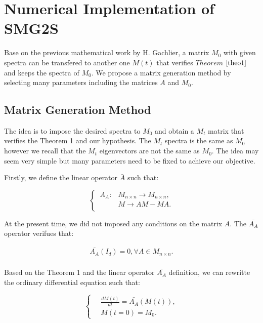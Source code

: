 \section{Numerical Implementation of SMG2S} \label{Matrix_Generation_Method}
Base on the previous mathematical work by H. Gachlier, a matrix $M_0$ with given spectra can be transfered to another one $M(t)$ that verifies $Theorem$ $\ref{theo1}$ and keeps the spectra of $M_0$. We propose a matrix generation method by selecting many parameters including the matrices $A$ and $M_0$. 

\subsection{Matrix Generation Method}

The idea is to impose the desired spectra to $M_0$ and obtain a $M_t$ matrix that verifies the Theorem 1 and our hypothesis. The $M_t$ spectra is the same as $M_0$ however we recall that the $M_t$ eigenvectors are not the same as $M_0$. The idea may seem very simple but many parameters need to be  fixed to achieve our objective.

Firstly, we define the linear operator $\bar{A}$ such that:

\begin{equation}
\left\{\
\begin{aligned}
A_A: &M_{n \times n} \rightarrow M_{n \times n}, \\
&M \rightarrow  AM-MA. \\ 
\end{aligned}
\right.
\end{equation}

At the present time, we did not imposed any conditions on the matrix $A$. The $\bar{A_A}$
operator verifues that:

\begin{equation}
\begin{aligned}
\bar{A_A}(I_d)=0, \forall A \in M_{n \times n}. \\ 
\end{aligned}
\end{equation}

Based on the Theorem 1 and the linear operator $\bar{A_A}$ definition, we can rewritte the
ordinary differential equation such that:

\begin{equation}
\label{eq3}
\left\{\
\begin{aligned} 
&\frac{dM(t)}{dt} =  \bar{A_A}(M(t)), \\ 
&M(t=0) =  M_0.
\end{aligned}
\right.
\end{equation}

